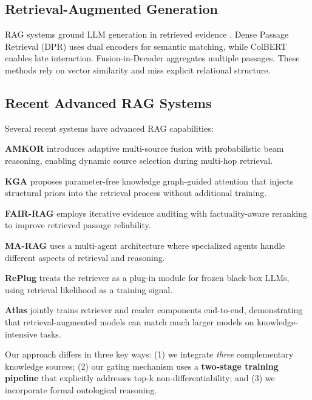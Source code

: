 \documentclass[10pt,twocolumn]{article}
\begin{document}
\subsection{Retrieval-Augmented Generation}

RAG systems ground LLM generation in retrieved evidence \cite{lewis2020rag}. Dense Passage Retrieval (DPR) \cite{karpukhin2020dpr} uses dual encoders for semantic matching, while ColBERT \cite{khattab2020colbert} enables late interaction. Fusion-in-Decoder \cite{izacard2021fid} aggregates multiple passages. These methods rely on vector similarity and miss explicit relational structure.

\subsection{Recent Advanced RAG Systems}
\label{sec:recent_rag}

Several recent systems have advanced RAG capabilities:

\textbf{AMKOR} \cite{fang2024amkor} introduces adaptive multi-source fusion with probabilistic beam reasoning, enabling dynamic source selection during multi-hop retrieval.

\textbf{KGA} \cite{wang2024kga} proposes parameter-free knowledge graph-guided attention that injects structural priors into the retrieval process without additional training.

\textbf{FAIR-RAG} \cite{chen2024fairrag} employs iterative evidence auditing with factuality-aware reranking to improve retrieved passage reliability.

\textbf{MA-RAG} \cite{li2024marag} uses a multi-agent architecture where specialized agents handle different aspects of retrieval and reasoning.

\textbf{RePlug} \cite{shi2024replug} treats the retriever as a plug-in module for frozen black-box LLMs, using retrieval likelihood as a training signal.

\textbf{Atlas} \cite{izacard2023atlas} jointly trains retriever and reader components end-to-end, demonstrating that retrieval-augmented models can match much larger models on knowledge-intensive tasks.

Our approach differs in three key ways: (1) we integrate \textit{three} complementary knowledge sources; (2) our gating mechanism uses a \textbf{two-stage training pipeline} that explicitly addresses top-k non-differentiability; and (3) we incorporate formal ontological reasoning.
\end{document}
